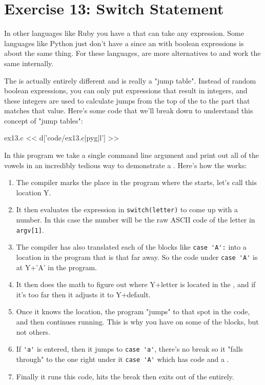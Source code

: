 \chapter{Exercise 13: Switch Statement}

In other languages like Ruby you have a  that can take
any expression.  Some languages like Python just don't have a
 since an  with boolean expressions
is about the same thing.  For these languages,  are
more alternatives to  and work the same internally.

The  is actually entirely different and is really a "jump
table".  Instead of random boolean expressions, you can only put expressions
that result in integers, and these integers are used to calculate jumps from
the top of the  to the part that matches that value.  Here's some
code that we'll break down to understand this concept of "jump tables":

\begin{code}{ex13.c}
<< d['code/ex13.c|pyg|l'] >>
\end{code}

In this program we take a single command line argument and print out all
of the vowels in an incredibly tedious way to demonstrate
a .  Here's how the 
works:

\begin{enumerate}
\item The compiler marks the place in the program where the
     starts, let's call this location Y.
\item It then evaluates the expression in \verb|switch(letter)| to
    come up with a number.  In this case the number will be the
    raw ASCII code of the letter in \verb|argv[1]|.
\item The compiler has also translated each of the  
    blocks like \verb|case 'A':| into a location in the program
    that is that far away.  So the code under \verb|case 'A'| is
    at Y+'A' in the program.
\item It then does the math to figure out where Y+letter is
    located in the , and if it's too
    far then it adjusts it to Y+default.
\item Once it knows the location, the program "jumps" to that spot
    in the code, and then continues running.  This is why you have
     on some of the  blocks, but not others.
\item If \verb|'a'| is entered, then it jumps to \verb|case 'a'|, there's
    no break so it "falls through" to the one right under it \verb|case 'A'|
    which has code and a .
\item Finally it runs this code, hits the break then exits out of the
     entirely.
\end{enumerate}

